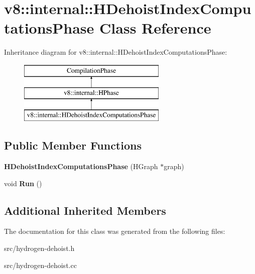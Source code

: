 \hypertarget{classv8_1_1internal_1_1_h_dehoist_index_computations_phase}{}\section{v8\+:\+:internal\+:\+:H\+Dehoist\+Index\+Computations\+Phase Class Reference}
\label{classv8_1_1internal_1_1_h_dehoist_index_computations_phase}
Inheritance diagram for v8\+:\+:internal\+:\+:H\+Dehoist\+Index\+Computations\+Phase\+:\begin{figure}[H]
\begin{center}
\leavevmode
\includegraphics[height=3.000000cm]{classv8_1_1internal_1_1_h_dehoist_index_computations_phase}
\end{center}
\end{figure}
\subsection*{Public Member Functions}
\begin{DoxyCompactItemize}
\item 
\hypertarget{classv8_1_1internal_1_1_h_dehoist_index_computations_phase_a91a58aca8baa306f4cf62dc5b66a36ed}{}{\bfseries H\+Dehoist\+Index\+Computations\+Phase} (H\+Graph $\ast$graph)\label{classv8_1_1internal_1_1_h_dehoist_index_computations_phase_a91a58aca8baa306f4cf62dc5b66a36ed}

\item 
\hypertarget{classv8_1_1internal_1_1_h_dehoist_index_computations_phase_a3ce3a283ea371cedf8c7c5e24598a29d}{}void {\bfseries Run} ()\label{classv8_1_1internal_1_1_h_dehoist_index_computations_phase_a3ce3a283ea371cedf8c7c5e24598a29d}

\end{DoxyCompactItemize}
\subsection*{Additional Inherited Members}


The documentation for this class was generated from the following files\+:\begin{DoxyCompactItemize}
\item 
src/hydrogen-\/dehoist.\+h\item 
src/hydrogen-\/dehoist.\+cc\end{DoxyCompactItemize}
